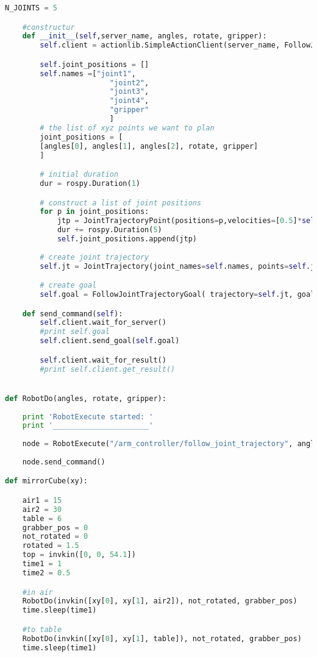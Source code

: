 \begin{lstlisting}[language=Python]
    N_JOINTS = 5

    #constructur
    def __init__(self,server_name, angles, rotate, gripper):
        self.client = actionlib.SimpleActionClient(server_name, FollowJointTrajectoryAction)

        self.joint_positions = []
        self.names =["joint1",
                        "joint2",
                        "joint3",
                        "joint4",
                        "gripper"
                        ]
        # the list of xyz points we want to plan
        joint_positions = [
        [angles[0], angles[1], angles[2], rotate, gripper]
        ]

        # initial duration
        dur = rospy.Duration(1)

        # construct a list of joint positions
        for p in joint_positions:
            jtp = JointTrajectoryPoint(positions=p,velocities=[0.5]*self.N_JOINTS, time_from_start=dur)
            dur += rospy.Duration(5)
            self.joint_positions.append(jtp)
        
        # create joint trajectory
        self.jt = JointTrajectory(joint_names=self.names, points=self.joint_positions)

        # create goal
        self.goal = FollowJointTrajectoryGoal( trajectory=self.jt, goal_time_tolerance=dur+rospy.Duration(2) )

    def send_command(self):
        self.client.wait_for_server()
        #print self.goal
        self.client.send_goal(self.goal)

        self.client.wait_for_result()
        #print self.client.get_result()


def RobotDo(angles, rotate, gripper):
        
    print 'RobotExecute started: '
    print '______________________'
    
    node = RobotExecute("/arm_controller/follow_joint_trajectory", angles, rotate, gripper)
    
    node.send_command()

def mirrorCube(xy):

    air1 = 15
    air2 = 30
    table = 6
    grabber_pos = 0
    not_rotated = 0
    rotated = 1.5
    top = invkin([0, 0, 54.1])
    time1 = 1
    time2 = 0.5

    #in air
    RobotDo(invkin([xy[0], xy[1], air2]), not_rotated, grabber_pos)
    time.sleep(time1)

    #to table
    RobotDo(invkin([xy[0], xy[1], table]), not_rotated, grabber_pos)
    time.sleep(time1)


\end{lstlisting}
